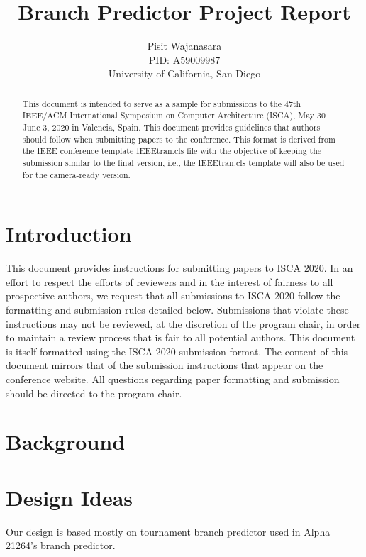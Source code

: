 \documentclass[conference]{IEEEtran}
\title{Branch Predictor Project Report}
\author{Pisit Wajanasara\\
PID: A59009987\\
University of California, San Diego}
\begin{document}
\maketitle
\thispagestyle{firstpage}
\pagestyle{plain}




\begin{abstract}

This document is intended to serve as a sample for submissions to the
47th IEEE/ACM International Symposium on Computer Architecture (ISCA),
May 30 -- June 3, 2020 in Valencia, Spain. This document provides
guidelines that authors should follow when submitting papers to the
conference.  This format is derived from the IEEE conference template IEEEtran.cls
file with the objective of keeping the submission similar to the final
version, i.e., the IEEEtran.cls template will also be used for
  the camera-ready version.

\end{abstract}

\section{Introduction}

This document provides instructions for submitting papers to ISCA
2020.  In an effort to respect the efforts of reviewers and in the
interest of fairness to all prospective authors, we request that all
submissions to ISCA 2020 follow the formatting and submission rules
detailed below. Submissions that violate these instructions may not be
reviewed, at the discretion of the program chair, in order to
maintain a review process that is fair to all potential authors. This
document is itself formatted using the ISCA 2020 submission format. The
content of this document mirrors that of the submission instructions
that appear on the conference website. All questions regarding paper
formatting and submission should be directed to the program chair.

\section{Background}

\section{Design Ideas}

Our design is based mostly on tournament branch predictor used in Alpha 21264's branch
predictor.
\end{document}
